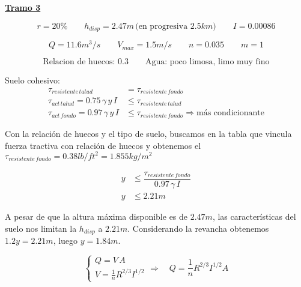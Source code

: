 \underline{\bf Tramo 3}

\begin{equation*}
  r = 20\%
 \qquad
  h_{disp} = 2.47 m \,\text{(en progresiva }2.5 km \text{)}
 \qquad
  I = 0.00086
\end{equation*}

\begin{equation*}
  Q = 11.6 m^3/s
 \qquad
  V_{max} = 1.5 m/s
 \qquad
  n = 0.035
 \qquad
  m = 1
\end{equation*}

\begin{equation*}
  \text{Relacion de huecos: 0.3}
  \qquad
  \text{Agua: poco limosa, limo muy fino}
\end{equation*}

Suelo cohesivo:
\begin{align*}
 \tau_{resistente\,talud} &= \tau_{resistente\,fondo} \\
 \tau_{act\,talud} = 0.75 \, \gamma \, y \, I &\leq \tau_{resistente\,talud} \\
 \tau_{act\,fondo} = 0.97 \, \gamma \, y \, I &\leq \tau_{resistente\,fondo} \Longrightarrow \text{más condicionante}
\end{align*}

Con la relación de huecos y el tipo de suelo, buscamos en la tabla que vincula fuerza tractiva con relación de huecos y obtenemos
el $\tau_{resistente\,fondo} = 0.38 lb/ft^2 = 1.855 kg/m^2$

\begin{align*}
 y &\leq \dfrac{\tau_{resistente\,fondo}}{0.97 \, \gamma \, I} \\
 y &\leq 2.21 m
\end{align*}

A pesar de que la altura máxima disponible es de $2.47 m$, las características del suelo nos limitan la $h_{disp}$ a $2.21 m$.
Considerando la revancha obtenemos $1.2 y = 2.21 m$, luego $y = 1.84 m$.

\begin{equation*}
  \begin{cases}
    Q = V \, A \\
    V =  \frac{1}{n} R^{2/3} I^{1/2}
  \end{cases}
  \Longrightarrow \quad
  Q = \frac{1}{n} R^{2/3} I^{1/2} A
\end{equation*}

